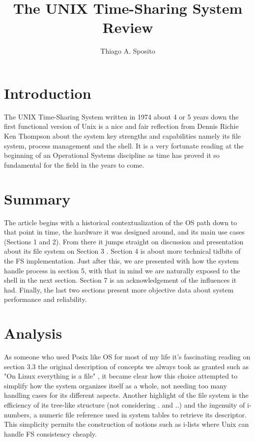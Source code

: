 \documentclass[12pt]{article}
\title{The UNIX Time-Sharing System Review}
\author{Thiago A. Sposito\inst{1} }
\begin{document}
 

\maketitle


\section{Introduction}

The UNIX Time-Sharing System written in 1974 about 4 or 5 years down the first functional version of Unix \cite{ritchie1978unix} is a nice and fair reflection from Dennis Richie Ken Thompson about the system key strengths and capabilities namely its file system, process management and the shell. It is a very fortunate reading at the beginning of an Operational Systems discipline as time has proved it so fundamental for the field in the years to come\cite{richie_benet_1999}.

\section{Summary} 

The article begins with a historical contextualization of the OS path down to that point in time, the hardware it was designed around, and its main use cases (Sections 1 and 2). From there it jumps straight on discussion and presentation about its file system on Section 3 . Section 4 is about more technical tidbits of the FS implementation. Just after this, we are presented with how the system handle process in section 5, with that in mind we are naturally exposed to the shell in the next section. Section 7 is an acknowledgement of the influences it had. Finally, the last two sections present more objective data about system performance and reliability. 


\section{Analysis}

As someone who used Posix like OS for most of my life it's fascinating reading on section 3.3 the original description of concepts we always took as granted such as "On Linux everything is a file" \cite{torvalds_2007}, it became clear how this choice attempted to simplify how the system organizes itself as a whole, not needing too many handling cases for its different aspects. Another highlight of the file system is the efficiency of its tree-like structure (not considering  . and ..) and the ingenuity of i-numbers, a  numeric file reference used in system tables to retrieve its descriptor. This simplicity permits the construction of notions such as i-lists where Unix can handle FS consistency cheaply. 
\end{document}

